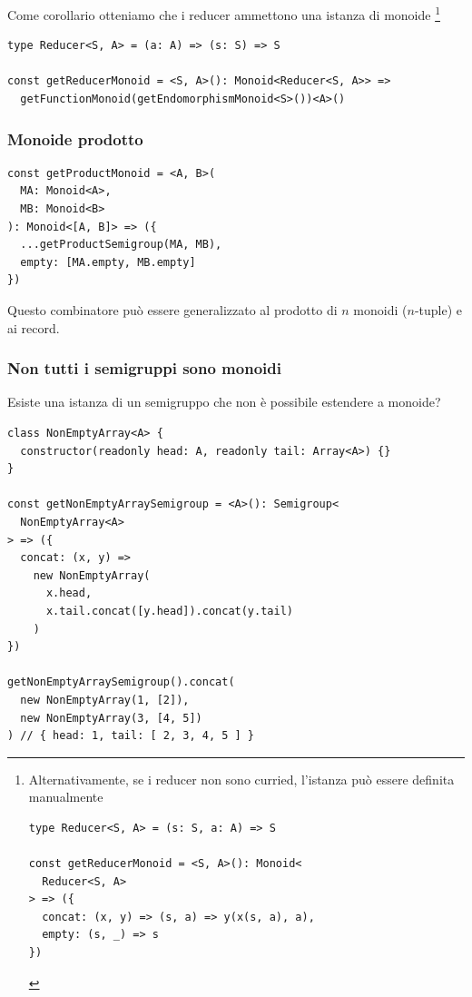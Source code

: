 \documentclass[12pt]{article}
\begin{document}
Come corollario otteniamo che i reducer ammettono una istanza di monoide
\footnote{Alternativamente, se i reducer non sono curried, l'istanza può essere definita manualmente

\begin{verbatim}
type Reducer<S, A> = (s: S, a: A) => S

const getReducerMonoid = <S, A>(): Monoid<
  Reducer<S, A>
> => ({
  concat: (x, y) => (s, a) => y(x(s, a), a),
  empty: (s, _) => s
})
\end{verbatim}

}

\begin{verbatim}
type Reducer<S, A> = (a: A) => (s: S) => S

const getReducerMonoid = <S, A>(): Monoid<Reducer<S, A>> =>
  getFunctionMonoid(getEndomorphismMonoid<S>())<A>()
\end{verbatim}

\subsubsection{Monoide prodotto}

\begin{verbatim}
const getProductMonoid = <A, B>(
  MA: Monoid<A>,
  MB: Monoid<B>
): Monoid<[A, B]> => ({
  ...getProductSemigroup(MA, MB),
  empty: [MA.empty, MB.empty]
})
\end{verbatim}

Questo combinatore può essere generalizzato al prodotto di $n$ monoidi ($n$-tuple) e ai record.

\subsubsection{Non tutti i semigruppi sono monoidi}

Esiste una istanza di un semigruppo che non è possibile estendere a monoide?

\begin{verbatim}
class NonEmptyArray<A> {
  constructor(readonly head: A, readonly tail: Array<A>) {}
}

const getNonEmptyArraySemigroup = <A>(): Semigroup<
  NonEmptyArray<A>
> => ({
  concat: (x, y) =>
    new NonEmptyArray(
      x.head,
      x.tail.concat([y.head]).concat(y.tail)
    )
})

getNonEmptyArraySemigroup().concat(
  new NonEmptyArray(1, [2]),
  new NonEmptyArray(3, [4, 5])
) // { head: 1, tail: [ 2, 3, 4, 5 ] }
\end{verbatim}
\end{document}
